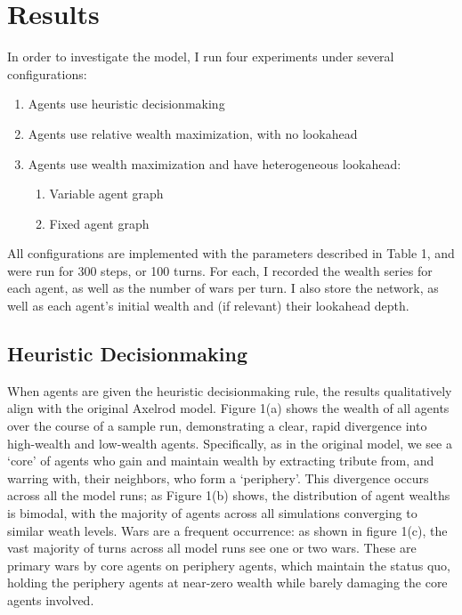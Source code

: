 \documentclass{article}
\begin{document}
\section{Results}

In order to investigate the model, I run four experiments under several configurations:
\begin{enumerate}
	\item Agents use heuristic decisionmaking
	\item Agents use relative wealth maximization, with no lookahead
	\item Agents use wealth maximization and have heterogeneous lookahead: 
	\begin{enumerate}
		\item Variable agent graph
		\item Fixed agent graph
	\end{enumerate}
\end{enumerate}

All configurations are implemented with the parameters described in Table 1, and were run for 300 steps, or 100 turns. For each, I recorded the wealth series for each agent, as well as the number of wars per turn. I also store the network, as well as each agent's initial wealth and (if relevant) their lookahead depth. 

\subsection{Heuristic Decisionmaking}
When agents are given the heuristic decisionmaking rule, the results qualitatively align with the original Axelrod model. Figure 1(a) shows the wealth of all agents over the course of a sample run, demonstrating a clear, rapid divergence into high-wealth and low-wealth agents. Specifically, as in the original model, we see a `core' of agents who gain and maintain wealth by extracting tribute from, and warring with, their neighbors, who form a `periphery'.  This divergence occurs across all the model runs; as Figure 1(b) shows, the distribution of agent wealths is bimodal, with the majority of agents across all simulations converging to similar weath levels. Wars are a frequent occurrence: as shown in figure 1(c), the vast majority of turns across all model runs see one or two wars. These are primary wars by core agents on periphery agents, which maintain the status quo, holding the periphery agents at near-zero wealth while barely damaging the core agents involved.
\end{document}
